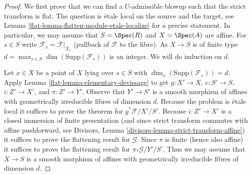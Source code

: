 \begin{proof}

We first prove that we can find a $U$-admissible blowup such that the
strict transform is flat. The question is \'etale local on the source
and the target, see
Lemma \ref{flat-lemma-flatten-module-etale-localize} for a precise statement.
In particular, we may assume that $S = \Spec(R)$ and $X = \Spec(A)$
are affine. For $s \in S$ write $\mathcal{F}_s = \mathcal{F}|_{X_s}$
(pullback of $\mathcal{F}$ to the fibre). As $X \to S$ is of finite type
$d = \max_{s \in S} \dim(\text{Supp}(\mathcal{F}_s))$
is an integer. We will do induction on $d$.

\medskip\noindent
Let $x \in X$ be a point of $X$ lying over $s \in S$ with
$\dim_x(\text{Supp}(\mathcal{F}_s)) = d$.
Apply Lemma \ref{flat-lemma-elementary-devissage} to get
$g : X' \to X$, $e : S' \to S$, $i : Z' \to X'$, and $\pi : Z' \to Y'$.
Observe that $Y' \to S'$ is
a smooth morphism of affines with geometrically irreducible fibres
of dimension $d$. Because the problem is \'etale local it suffices
to prove the theorem for $g^*\mathcal{F}/X'/S'$. Because $i : Z' \to X'$
is a closed immersion of finite presentation (and since strict transform
commutes with affine pushforward, see
Divisors, Lemma \ref{divisors-lemma-strict-transform-affine})
it suffices to prove the flattening result for $\mathcal{G}$.
Since $\pi$ is finite (hence also affine) it suffices to prove the
flattening result for $\pi_*\mathcal{G}/Y'/S'$. Thus we may assume
that $X \to S$ is a smooth morphism of affines with geometrically
irreducible fibres of dimension $d$.


\end{proof}
